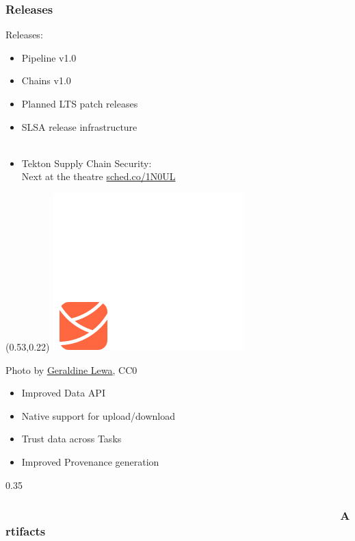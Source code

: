 \documentclass[aspectratio=169,11pt,hyperref={colorlinks=true}]{beamer}
\begin{document}
\begin{blackframe}
  \frametitle{Releases}
  Releases:
  \begin{itemize}
    \item Pipeline v1.0
    \item Chains v1.0
    \item Planned LTS patch releases
    \item SLSA release infrastructure\\~
    \item Tekton Supply Chain Security:\\
          Next at the theatre \href{https://sched.co/1N0UL}{sched.co/1N0UL}
  \end{itemize}
  \begin{textblock*}{0.35\paperwidth}(0.53\paperwidth,0.22\paperheight)
    \includegraphics[width=0.35\paperwidth]{img/tekton-chains-slsa.png}
  \end{textblock*}
\end{blackframe}

\begin{lpicrblack}{%
  Photo by \href{https://unsplash.com/@geraldine_lewa}{\underline{Geraldine Lewa}}, CC0
  }%
  {%
  \begin{itemize}
    \item Improved Data API
    \item Native support for upload/download
    \item Trust data across Tasks
    \item Improved Provenance generation
  \end{itemize}
  }%
  {0.35}
  \frametitle{~~~~~~~~~~~~~~~~~~~~~~~~~~~~~~~~~~~~~~~~~~~~~~~~~~~~Artifacts}
\end{lpicrblack}
\end{document}
